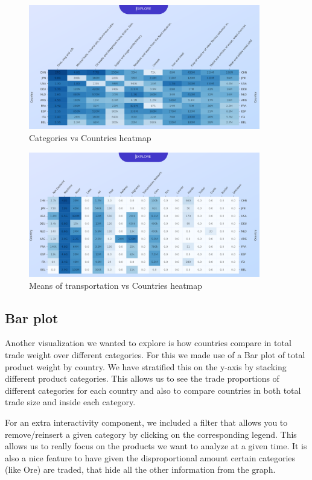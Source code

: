 \documentclass[12pt,a4]{article}
\begin{document}
\begin{figure}[H]
    \centering
    \includegraphics[width=0.9\textwidth]{assets/heat1.png}
    \caption{Categories vs Countries heatmap}
\end{figure}

\begin{figure}[H]
    \centering
    \includegraphics[width=0.9\textwidth]{assets/heat2.png}
    \caption{Means of transportation vs Countries heatmap}
\end{figure}

\subsection{Bar plot}
Another visualization we wanted to explore is how countries compare in total trade weight over different categories. For this we made use of a Bar plot of total product weight by country. We have stratified this on the y-axis by stacking different product categories. This allows us to see the trade proportions of different categories for each country and also to compare countries in both total trade size and inside each category.

For an extra interactivity component, we included a filter that allows you to remove/reinsert a given category by clicking on the corresponding legend. This allows us to really focus on the products we want to analyze at a given time. It is also a nice feature to have given the disproportional amount certain categories (like Ore) are traded, that hide all the other information from the graph.
\end{document}

